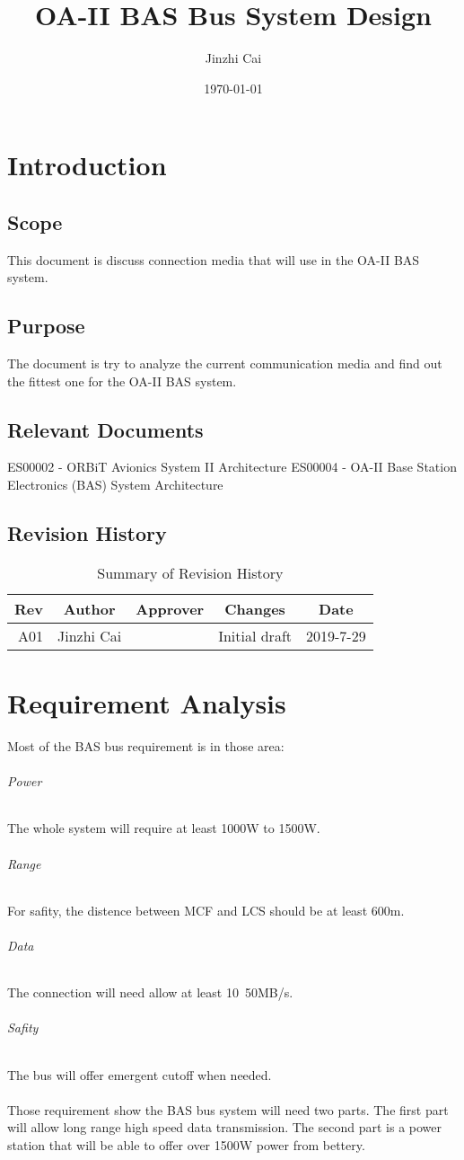 \documentclass[12pt,article]{memoir}
\title{OA-II BAS Bus System Design}
\author{Jinzhi Cai}
\date{\today}
\begin{document}
	


\tableofcontents*
\clearpage


\chapter{Introduction}
\section{Scope}
This document is discuss connection media that will use in the OA-II BAS system.
\section{Purpose}
The document is try to analyze the current communication media and find out the fittest one for the OA-II BAS system.
\section{Relevant Documents}
ES00002 - ORBiT Avionics System II Architecture
ES00004 - OA-II Base Station Electronics (BAS) System Architecture
\section{Revision History}
\begin{table}[H]
	\centering
	\begin{tabu}{r || c | c | c | c }
		Rev & Author & Approver & Changes & Date\\ \hline
		A01 & Jinzhi Cai & & Initial draft & 2019-7-29 \\
	\end{tabu}
	\caption{Summary of Revision History}
	\label{tab:rev}
\end{table}
\newpage
\chapter{Requirement Analysis}
Most of the BAS bus requirement is in those area:
\subparagraph{Power} The whole system will require at least 1000W to 1500W.
\subparagraph{Range} For safity, the distence between MCF and LCS should be at least 600m.
\subparagraph{Data} The connection will need allow at least 10~50MB/s.
\subparagraph{Safity} The bus will offer emergent cutoff when needed.\\\\
Those requirement show the BAS bus system will need two parts. The first part will allow long range high speed data transmission. The second part is a power station that will be able to offer over 1500W power from bettery.
\newpage
\end{document}
